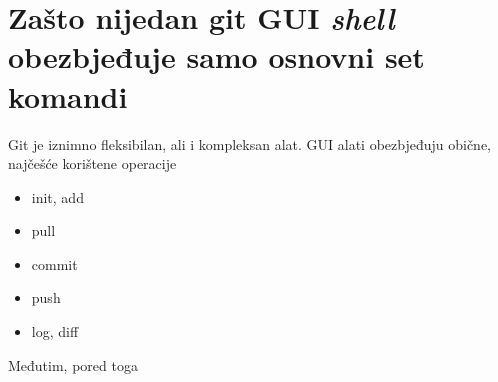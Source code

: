 \documentclass[times, utf8, seminar]{fit}
\begin{document}
%


%
%
%
%
%
%
%
%

%
%
\section{Zašto nijedan git GUI \emph{shell} obezbjeđuje samo osnovni set komandi}

Git je iznimno fleksibilan, ali i kompleksan alat. GUI alati obezbjeđuju obične, najčešće korištene operacije
\begin{itemize}
 \item init, add
 \item pull
 \item commit
 \item push
 \item log, diff
\end{itemize}

Međutim, pored toga
\end{document}
